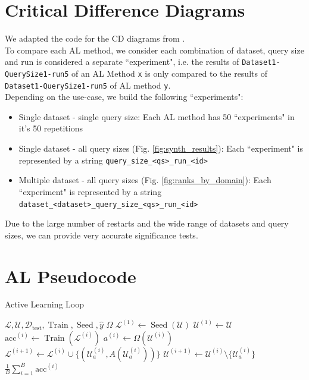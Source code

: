\documentclass[]{article}
\newcommand{\D}{\mathcal{D}}
\newcommand{\U}{\mathcal{U}}
\newcommand{\LL}{\mathcal{L}}
\begin{document}
\section{Critical Difference Diagrams}\label{app:cd_diagrams}
We adapted the code for the CD diagrams from \cite{cd_diagram_code}. \\
To compare each AL method, we consider each combination of dataset, query size and run is considered a separate ``experiment", i.e. the results of \verb|Dataset1-QuerySize1-run5| of an AL Method \verb|x| is only compared to the results of \verb|Dataset1-QuerySize1-run5| of AL method \verb|y|. \\
Depending on the use-case, we build the following ``experiments":
\begin{itemize}
	\item Single dataset - single query size: Each AL method has 50 ``experiments" in it's 50 repetitions
	\item Single dataset - all query sizes (Fig. \ref{fig:synth_results}): Each ``experiment" is represented by a string \verb|query_size_<qs>_run_<id>|
	\item Multiple dataset - all query sizes (Fig. \ref{fig:ranks_by_domain}): Each ``experiment" is represented by a string \verb|dataset_<dataset>_query_size_<qs>_run_<id>|
\end{itemize}
Due to the large number of restarts and the wide range of datasets and query sizes, we can provide very accurate significance tests.



\section{AL Pseudocode}\label{app:pseudocode}
\begin{algorithm}[H]
	\caption{Active Learning Loop}\label{alg:active_learning}
	\begin{algorithmic}[1]
		\Require $\LL, \U, \D_\text{test}, \operatorname{Train}, \operatorname{Seed}, \hat y$
		\Require $\Omega$ 
		\State $\LL^{(1)} \gets \operatorname{Seed}(\U)$  
		\State $\U^{(1)} \gets \U$
		\State $\text{acc}^{(i)} \gets \operatorname{Train}(\LL^{(i)})$ 
		\State $a^{(i)} \gets \Omega(\mathcal{U}^{(i)})$ 
		\State $\mathcal{L}^{(i+1)} \gets \mathcal{L}^{(i)} \cup \{(\U^{(i)}_a, A(\U^{(i)}_{a}))\}$
		\State $\U^{(i+1)} \gets \U^{(i)} \setminus \{\U^{(i)}_a\}$
		\EndFor
		\State
		\Return $\frac{1}{B} \sum_{i=1}^{B} \text{acc}^{(i)}$
	\end{algorithmic}
\end{algorithm}
\end{document}
